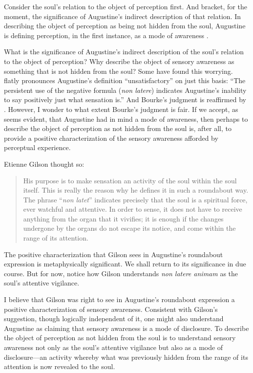 \documentclass[12pt]{article}
\begin{document}
Consider the soul's relation to the object of perception first. And bracket, for the moment, the significance of Augustine's indirect description of that relation. In describing the object of perception as being not hidden from the soul, Augustine is defining perception, in the first instance, as a mode of awareness \citep[275]{Brittain:2002hl}. 

What is the significance of Augustine's indirect description of the soul's relation to the object of perception? Why describe the object of sensory awareness as something that is not hidden from the soul? Some have found this worrying. \citet[112]{Bourke:1947jk} flatly pronounces Augustine's definition ``unsatisfactory'' on just this basis: ``The persistent use of the negative formula (\emph{non latere}) indicates Augustine's inability to say positively just what sensation is.'' And Bourke's judgment is reaffirmed by \citet[104, n. 1]{McMahon:1947dn}. However, I wonder to what extent Bourke's judgment is fair. If we accept, as seems evident, that Augustine had in mind a mode of awareness, then perhaps to describe the object of perception as not hidden from the soul is, after all, to provide a positive characterization of the sensory awareness afforded by perceptual experience.  

Etienne Gilson thought so:
\begin{quote}
	His purpose is to make sensation an activity of the soul within the soul itself. This is really the reason why he defines it in such a roundabout way. The phrase ``\emph{non latet}'' indicates precisely that the soul is a spiritual force, ever watchful and attentive. In order to sense, it does not have to receive anything from the organ that it vivifies; it is enough if the changes undergone by the organs do not escape its notice, and come within the range of its attention. \citep[63]{Gilson:1961ec}
\end{quote}
The positive characterization that Gilson sees in Augustine's roundabout expression is metaphysically significant. We shall return to its significance in due course. But for now, notice how Gilson understands \emph{non latere animam} as the soul's attentive vigilance. 

I believe that Gilson was right to see in Augustine's roundabout expression a positive characterization of sensory awareness. Consistent with Gilson's suggestion, though logically independent of it, one might also understand Augustine as claiming that sensory awareness is a mode of disclosure. To describe the object of perception as not hidden from the soul is to understand sensory awareness not only as the soul's attentive vigilance but also as a mode of disclosure---an activity whereby what was previously hidden from the range of its attention is now revealed to the soul.
\end{document}
